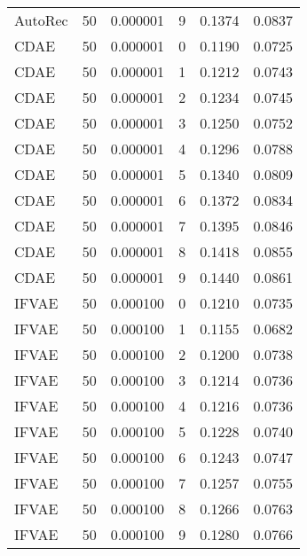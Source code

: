 \begin{tabular}{llrlrr}
 AutoRec &   50 &  0.000001 &     9 &  0.1374 &       0.0837 \\
    CDAE &   50 &  0.000001 &     0 &  0.1190 &       0.0725 \\
    CDAE &   50 &  0.000001 &     1 &  0.1212 &       0.0743 \\
    CDAE &   50 &  0.000001 &     2 &  0.1234 &       0.0745 \\
    CDAE &   50 &  0.000001 &     3 &  0.1250 &       0.0752 \\
    CDAE &   50 &  0.000001 &     4 &  0.1296 &       0.0788 \\
    CDAE &   50 &  0.000001 &     5 &  0.1340 &       0.0809 \\
    CDAE &   50 &  0.000001 &     6 &  0.1372 &       0.0834 \\
    CDAE &   50 &  0.000001 &     7 &  0.1395 &       0.0846 \\
    CDAE &   50 &  0.000001 &     8 &  0.1418 &       0.0855 \\
    CDAE &   50 &  0.000001 &     9 &  0.1440 &       0.0861 \\
   IFVAE &   50 &  0.000100 &     0 &  0.1210 &       0.0735 \\
   IFVAE &   50 &  0.000100 &     1 &  0.1155 &       0.0682 \\
   IFVAE &   50 &  0.000100 &     2 &  0.1200 &       0.0738 \\
   IFVAE &   50 &  0.000100 &     3 &  0.1214 &       0.0736 \\
   IFVAE &   50 &  0.000100 &     4 &  0.1216 &       0.0736 \\
   IFVAE &   50 &  0.000100 &     5 &  0.1228 &       0.0740 \\
   IFVAE &   50 &  0.000100 &     6 &  0.1243 &       0.0747 \\
   IFVAE &   50 &  0.000100 &     7 &  0.1257 &       0.0755 \\
   IFVAE &   50 &  0.000100 &     8 &  0.1266 &       0.0763 \\
   IFVAE &   50 &  0.000100 &     9 &  0.1280 &       0.0766 \\
\bottomrule
\end{tabular}
